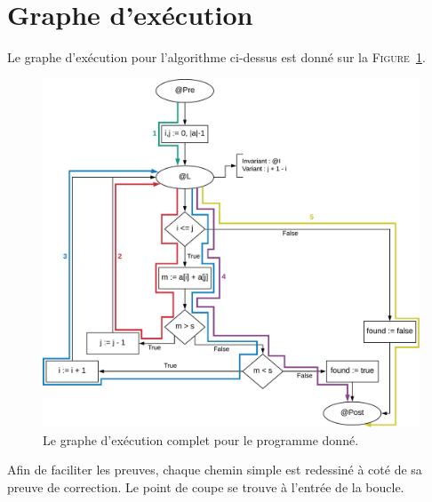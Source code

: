 \documentclass{elsarticle}
\begin{document}
\section{Graphe d'exécution}
Le graphe d'exécution pour l'algorithme ci-dessus est donné sur la \textsc{Figure}~\ref{fig:execgraph}.
\begin{figure}[htbp]
	\centering
	\includegraphics[width=\textwidth]{svg-inkscape/execgraph_svg-tex.pdf}
	\caption{Le graphe d'exécution complet pour le programme donné.}
	\label{fig:execgraph}
\end{figure}
Afin de faciliter les preuves, chaque chemin simple est redessiné à coté de sa preuve de correction.
Le point de coupe se trouve à l'entrée de la boucle.
\end{document}
